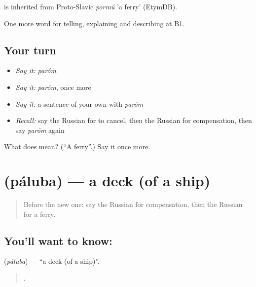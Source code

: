 \begin{cousinweb}
\emph{} is inherited from Proto-Slavic \emph{pormŭ} 'a ferry' (EtymDB).
\end{cousinweb}

\begin{grammarlens}[title={What you've built}]
One more word for telling, explaining and describing at B1.
\end{grammarlens}

\subsection*{Your turn}
\begin{itemize}
\raggedright
  \item \emph{Say it:} \emph{paróm}
  \item \emph{Say it:} \emph{paróm}, once more
  \item \emph{Say it:} a sentence of your own with \emph{paróm}
  \item \emph{Recall:} say the Russian for to cancel, then the Russian for compensation, then say \emph{paróm} again
\end{itemize}

\begin{tcolorbox}[breakable,colback=teal!4,colframe=teal!35!black,title={Before you move on}]
What does  mean? (\textquotedblleft{}A ferry\textquotedblright{}.) Say it once more.
\end{tcolorbox}
\section[\texorpdfstring{\ru{палуба} (páluba)}{палуба (páluba)}]{ (páluba) — a deck (of a ship)}

\label{lesson:RU-C424-paluba}



\begin{quote}
Before the new one: say the Russian for compensation, then the Russian for a ferry.
\end{quote}

\subsection*{You'll want to know: }
\textbf{} (\emph{páluba}) — \textquotedblleft{}a deck (of a ship)\textquotedblright{}.

\begin{quote}
     .
\end{quote}

